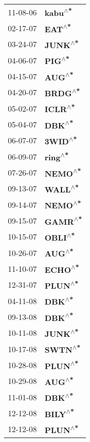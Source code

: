 \begin{supertabular}{p{0.08\textwidth}p{0.2\textwidth}}
 11-08-06 &   \textbf{kabu\textsuperscript{$\wedge$*}} \\
 02-17-07 &    \textbf{EAT\textsuperscript{$\wedge$*}} \\
 03-24-07 &   \textbf{JUNK\textsuperscript{$\wedge$*}} \\
 04-06-07 &    \textbf{PIG\textsuperscript{$\wedge$*}} \\
 04-15-07 &    \textbf{AUG\textsuperscript{$\wedge$*}} \\
 04-20-07 &   \textbf{BRDG\textsuperscript{$\wedge$*}} \\
 05-02-07 &   \textbf{ICLR\textsuperscript{$\wedge$*}} \\
 05-04-07 &    \textbf{DBK\textsuperscript{$\wedge$*}} \\
 06-07-07 &   \textbf{3WID\textsuperscript{$\wedge$*}} \\
 06-09-07 &   \textbf{ring\textsuperscript{$\wedge$*}} \\
 07-26-07 &   \textbf{NEMO\textsuperscript{$\wedge$*}} \\
 09-13-07 &   \textbf{WALL\textsuperscript{$\wedge$*}} \\
 09-14-07 &   \textbf{NEMO\textsuperscript{$\wedge$*}} \\
 09-15-07 &   \textbf{GAMR\textsuperscript{$\wedge$*}} \\
 10-15-07 &   \textbf{OBLI\textsuperscript{$\wedge$*}} \\
 10-26-07 &    \textbf{AUG\textsuperscript{$\wedge$*}} \\
 11-10-07 &   \textbf{ECHO\textsuperscript{$\wedge$*}} \\
 12-31-07 &   \textbf{PLUN\textsuperscript{$\wedge$*}} \\
 04-11-08 &    \textbf{DBK\textsuperscript{$\wedge$*}} \\
 09-13-08 &    \textbf{DBK\textsuperscript{$\wedge$*}} \\
 10-11-08 &   \textbf{JUNK\textsuperscript{$\wedge$*}} \\
 10-17-08 &   \textbf{SWTN\textsuperscript{$\wedge$*}} \\
 10-28-08 &   \textbf{PLUN\textsuperscript{$\wedge$*}} \\
 10-29-08 &    \textbf{AUG\textsuperscript{$\wedge$*}} \\
 11-01-08 &    \textbf{DBK\textsuperscript{$\wedge$*}} \\
 12-12-08 &   \textbf{BILY\textsuperscript{$\wedge$*}} \\
 12-12-08 &   \textbf{PLUN\textsuperscript{$\wedge$*}} \\

\end{supertabular}
